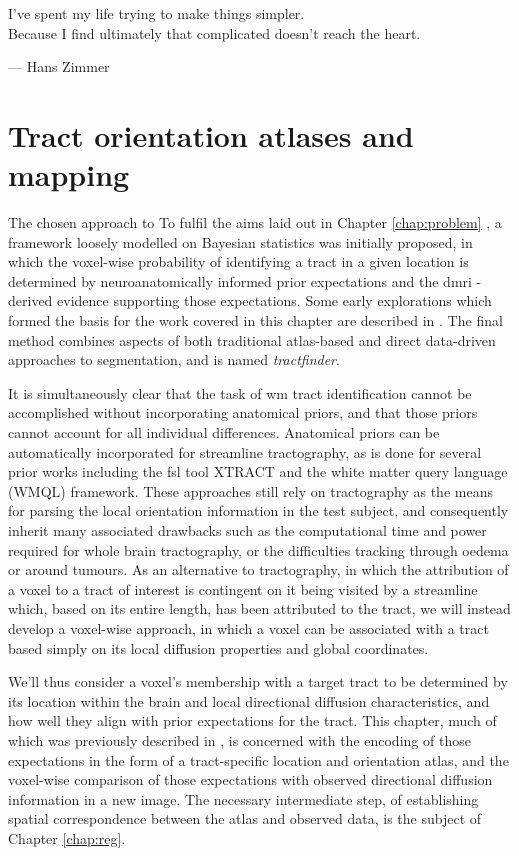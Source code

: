 \documentclass[12pt,phd,a4paper,twoside]{ucl_thesis}
\renewcommand{\textcite}[2][]{
\ifthenelse { \equal {#1} {} }  {\citeauthor{#2}\autocite{#2}}   {\citeauthor{#1}\autocite{#2}}}
\newcommand\epigraph[2]{\begin{flushright}
    \parbox{0.75\textwidth}{\raggedleft #1}
    \vskip 1.5\baselineskip
    --- #2
  \end{flushright}}
\newcommand\epart[2][]{\cleardoublepage          \thispagestyle{empty}
  \vspace*{.3\vsize}        \refstepcounter{part}
  \addcontentsline{toc}{part}{#2}{\centering \textbf{\sffamily\Huge#2}\par}\vspace*{\fill}
  {\sffamily#1}
  \vspace*{\fill}\pagebreak
}
\providecommand{\DIFaddtex}[1]{{\protect\color{blue} \sf #1}} %
\providecommand{\DIFdeltex}[1]{{\protect\color{red} \scriptsize #1}} %
\providecommand{\DIFaddbegin}{} %
\providecommand{\DIFaddend}{} %
\providecommand{\DIFdelbegin}{} %
\providecommand{\DIFdelend}{} %
\providecommand{\DIFadd}[1]{\texorpdfstring{\DIFaddtex{#1}}{#1}} %
\providecommand{\DIFdel}[1]{\texorpdfstring{\DIFdeltex{#1}}{}} %
\newcommand{\DIFscaledelfig}{0.5}
\newlength{\DIFdelgraphicswidth} %
\newlength{\DIFdelgraphicsheight} %
\newcommand{\DIFaddincludegraphics}[2][]{{\color{blue}\fbox{\DIFOincludegraphics[#1]{#2}}}} %
\newcommand{\DIFdelincludegraphics}[2][]{%
\sbox{\DIFdelgraphicsbox}{\DIFOincludegraphics[#1]{#2}}%
\settoboxwidth{\DIFdelgraphicswidth}{\DIFdelgraphicsbox} %
\settoboxtotalheight{\DIFdelgraphicsheight}{\DIFdelgraphicsbox} %
\scalebox{\DIFscaledelfig}{%
\parbox[b]{\DIFdelgraphicswidth}{\usebox{\DIFdelgraphicsbox}\\[-\baselineskip] \rule{\DIFdelgraphicswidth}{0em}}\llap{\resizebox{\DIFdelgraphicswidth}{\DIFdelgraphicsheight}{%
\setlength{\unitlength}{\DIFdelgraphicswidth}%
\begin{picture}(1,1)%
\thicklines\linethickness{2pt} %
{\color[rgb]{1,0,0}\put(0,0){\framebox(1,1){}}}%
{\color[rgb]{1,0,0}\put(0,0){\line( 1,1){1}}}%
{\color[rgb]{1,0,0}\put(0,1){\line(1,-1){1}}}%
\end{picture}%
}\hspace*{3pt}}} %
} %
\DeclareRobustCommand{\DIFaddbegin}{\DIFOaddbegin \let\includegraphics\DIFaddincludegraphics} %
\DeclareRobustCommand{\DIFaddend}{\DIFOaddend \let\includegraphics\DIFOincludegraphics} %
\DeclareRobustCommand{\DIFdelbegin}{\DIFOdelbegin \let\includegraphics\DIFdelincludegraphics} %
\DeclareRobustCommand{\DIFdelend}{\DIFOaddend \let\includegraphics\DIFOincludegraphics} %
\begin{document}
\epart[\epigraph{I've spent my life trying to make things simpler. \\ Because I find ultimately that complicated doesn't reach the heart.}{Hans Zimmer}]{Tractfinder}
\clearpage{}\chapter{Tract orientation atlases and mapping}
\label{chap:atlas}

\DIFdelbegin \DIFdel{The chosen approach to }\DIFdelend \DIFaddbegin \DIFadd{To }\DIFaddend fulfil the aims laid out in Chapter \ref{chap:problem}\DIFaddbegin \DIFadd{, a framework loosely modelled on Bayesian statistics was initially proposed, in which the voxel-wise probability of identifying a tract in a given location is determined by neuroanatomically informed prior expectations and the }\gls{dmri}\DIFadd{-derived evidence supporting those expectations.
Some early explorations which formed the basis for the work covered in this chapter are described in \textcite{Young2020}.
The final method }\DIFaddend combines aspects of both traditional atlas-based and direct data-driven approaches to segmentation, and is named \textit{tractfinder}.
\DIFaddbegin 

\DIFaddend It is simultaneously clear that the task of \gls{wm} tract identification cannot be accomplished without incorporating anatomical priors, and that those priors cannot account for all individual differences.
Anatomical priors can be automatically incorporated for streamline tractography, as is done for several prior works including the \gls{fsl} tool XTRACT\autocite{Warrington2020} and the white matter query language (WMQL) framework\autocite{Wassermann2016}.
These approaches still rely on tractography as the means for parsing the local orientation information in the test subject, and consequently inherit many associated drawbacks such as the computational time and power required for whole brain tractography, or the difficulties tracking through oedema or around tumours.
As an alternative to tractography, in which the attribution of a voxel to a tract of interest is contingent on it being visited by a streamline which, based on its entire length, has been attributed to the tract, we will instead develop a voxel-wise approach, in which a voxel can be associated with a tract based simply on its local diffusion properties and global coordinates.

We'll thus consider a voxel's membership with a target tract to be determined by its location within the brain and local directional diffusion characteristics, and how well they align with prior expectations for the tract.
This chapter, much of which was previously described in \textcite{Young2024}, is concerned with the encoding of those expectations in the form of a tract-specific location and orientation atlas, and the voxel-wise comparison of those expectations with observed directional diffusion information in a new image.
The necessary intermediate step, of establishing spatial correspondence between the atlas and observed data, is the subject of Chapter \ref{chap:reg}.
\end{document}
